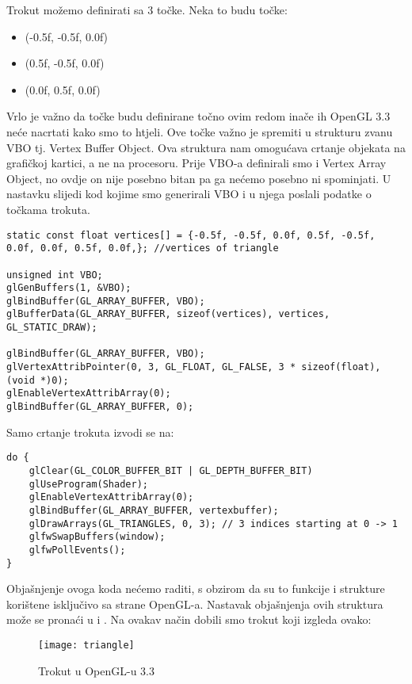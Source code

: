 Trokut možemo definirati sa 3 točke. Neka to budu točke:
\begin{itemize}
	\item (-0.5f, -0.5f, 0.0f)
	\item (0.5f, -0.5f, 0.0f)
	\item (0.0f, 0.5f, 0.0f)
\end{itemize}
Vrlo je važno da točke budu definirane točno ovim redom inače ih OpenGL 3.3 neće nacrtati kako smo to htjeli. Ove točke važno je spremiti u strukturu zvanu VBO tj. Vertex Buffer Object. Ova struktura nam omogućava crtanje objekata na grafičkoj kartici, a ne na procesoru\cite{16}. Prije VBO-a definirali smo i Vertex Array Object, no ovdje on nije posebno bitan pa ga nećemo posebno ni spominjati. U nastavku slijedi kod kojime smo generirali VBO i u njega poslali podatke o točkama trokuta\cite{15}.\newpage
\begin{lstlisting}[style = myC++, label = {code:15}, caption = {Generiranje VBO\cite{16}}]
static const float vertices[] = {-0.5f, -0.5f, 0.0f, 0.5f, -0.5f, 0.0f, 0.0f, 0.5f, 0.0f,}; //vertices of triangle
	  
unsigned int VBO;
glGenBuffers(1, &VBO);
glBindBuffer(GL_ARRAY_BUFFER, VBO);
glBufferData(GL_ARRAY_BUFFER, sizeof(vertices), vertices, GL_STATIC_DRAW);
	  
glBindBuffer(GL_ARRAY_BUFFER, VBO);
glVertexAttribPointer(0, 3, GL_FLOAT, GL_FALSE, 3 * sizeof(float), (void *)0);
glEnableVertexAttribArray(0);
glBindBuffer(GL_ARRAY_BUFFER, 0);
\end{lstlisting}
Samo crtanje trokuta izvodi se na:
\begin{lstlisting}[style = myC++, label = {code:16}, caption = {Crtanje trokuta\cite{15}}]
do {
	glClear(GL_COLOR_BUFFER_BIT | GL_DEPTH_BUFFER_BIT)
	glUseProgram(Shader);
	glEnableVertexAttribArray(0);
	glBindBuffer(GL_ARRAY_BUFFER, vertexbuffer);
	glDrawArrays(GL_TRIANGLES, 0, 3); // 3 indices starting at 0 -> 1
	glfwSwapBuffers(window);
	glfwPollEvents();
}
\end{lstlisting}

Objašnjenje ovoga koda nećemo raditi, s obzirom da su to funkcije i strukture korištene isključivo sa strane OpenGL-a. Nastavak objašnjenja ovih struktura može se pronaći u \cite{15} i \cite{16}. Na ovakav način dobili smo trokut koji izgleda ovako:\newpage
\begin{figure}[!http]
	\begin{center}
		\texttt{[image: triangle]}
		\caption{Trokut u OpenGL-u 3.3}
		\label{fig:29}
		\end{center}
\end{figure}

